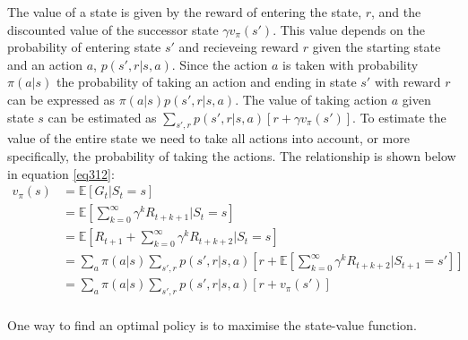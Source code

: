 \documentclass[11pt]{article}
\begin{document}
The value of a state is given by the reward of entering the state, $r$, and the discounted value of the successor state
$\gamma v_\pi(s')$.
This value depends on the probability of entering state $s'$ and recieveing reward $r$ given
the starting state and an action $a$, $p(s', r | s, a)$.
Since the action $a$ is taken with probability $\pi(a|s)$ the probability of taking an action and ending in state $s'$ with reward $r$
can be expressed as $\pi(a|s) p(s', r | s, a)$.
The value of taking action $a$ given state $s$ can be estimated as $\sum\limits_{s',r} p(s',r|s,a)\left [r + \gamma v_\pi(s') \right ]$.
To estimate the value of the entire state we need to take all actions into account, or more specifically,
the probability of taking the actions.
The relationship is shown below in equation \ref{eq312}:
\begin{equation}\label{eq312}
    \begin{split}
    v_\pi(s) & = \mathds{E}[G_t | S_t = s]\\
             & = \mathds{E} \left [\sum\limits_{k=0}^\infty \gamma^k R_{t + k + 1} | S_t = s\right ]\\
             & = \mathds{E} \left [R_{t+1} + \sum\limits_{k=0}^\infty \gamma^k R_{t + k + 2} | S_t = s\right ]\\
             & =  \sum\limits_a \pi(a|s) \sum\limits_{s',r}p(s',r|s, a)\left [r + \mathds{E} \left [\sum\limits_{k=0}^\infty \gamma^k R_{t + k + 2} | S_{t+1} = s'\right ]\right ]\\
             & =  \sum\limits_a \pi(a|s) \sum\limits_{s',r}p(s',r|s, a)\left [r + v_\pi(s')\right ]\\
    \end{split}
\end{equation}

One way to find an optimal policy is to maximise the state-value function.

%
%
\end{document}

